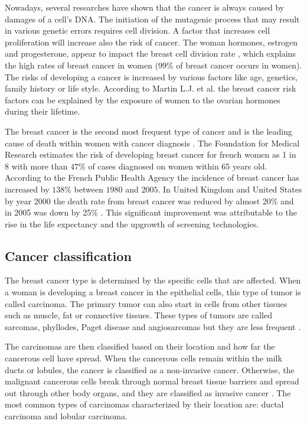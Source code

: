 Nowadays, several researches \citep{pike_estrogens_1993,martin_webmd_2017} have shown that the cancer is always caused by damages of a cell's DNA. The initiation of the mutagenic process that may result in various genetic errors requires cell division.  A factor that increases cell proliferation will increase also the risk of cancer. The woman hormones, estrogen and progesterone, appear to impact the breast cell division rate \citep{ciocca_estrogen_1997,fanelli_estrogen_1996},  which explains the high rates of breast cancer in women ($99\%$ of breast cancer occurs in women). The risks of developing a cancer is increased by various factors like age, genetics, family history or life style. According to Martin L.J. et al. \citep{martin_webmd_2017} the breast cancer risk factors can be explained by the exposure of women to the ovarian hormones during their lifetime.

The breast cancer is the second most frequent type of cancer and is the leading cause of death within women with cancer diagnosis \citep{spf_chiffres_2017}.  The Foundation for Medical Research \citep{frm_chiffres_2017} estimates the risk of developing breast cancer for french women as 1 in 8 with more than $47\%$ of cases diagnosed on women within 65 years old.
According to the French Public Health Agency \citep{spf_chiffres_2017} the incidence of breast cancer has increased by $138\% $ between $1980$ and $2005$. In United Kingdom and United States by year 2000 the death rate from breast cancer was reduced by almost 20\% and in 2005 was down by 25\% \citep{peto_uk_2000}. This significant improvement was attributable to the rise in the life expectancy and the upgrowth of screening technologies.


\subsection{Cancer classification }\label{subsection:breastcancerclasification}
The breast cancer type is determined by the specific cells that are affected. 
When a woman is developing a breast cancer in the epithelial cells, this type of tumor is called carcinoma. The primary tumor can also start in cells from other tissues such as muscle, fat or connective tissues. These types of tumors are called sarcomas, phyllodes, Paget disease and angiosarcomas but they are less frequent \citep{acs_cancer_2017}. 

The carcinomas are then classified based on their location and how far the cancerous cell have spread. When the cancerous cells remain within the milk ducts or lobules, the cancer is classified as a non-invasive cancer. Otherwise, the malignant cancerous cells break through normal breast tissue barriers and spread out through other body organs, and they are classified as invasive cancer \citep{andolina2011mammographic}. The most common types of carcinomas characterized by their location are: ductal carcinoma and lobular carcinoma. 

